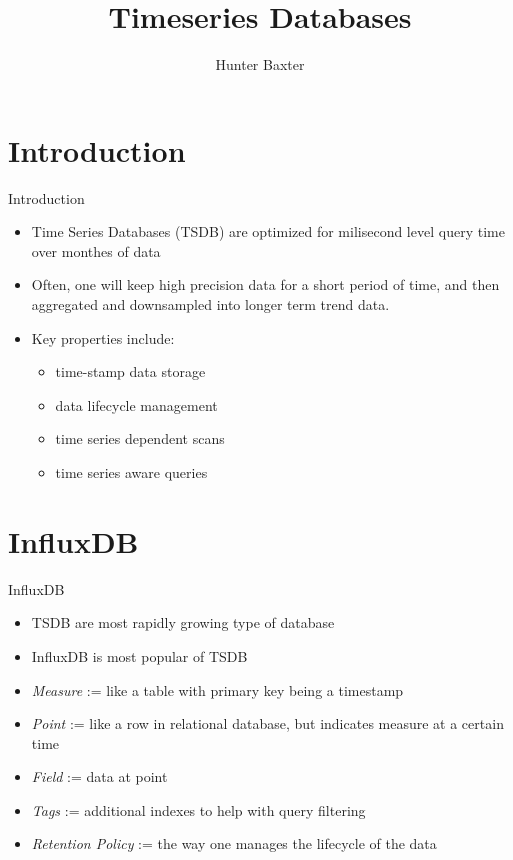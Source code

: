 \documentclass{beamer}
\title{Timeseries Databases}
\author{Hunter Baxter}
\begin{document}
\maketitle

\section{Introduction}
\begin{frame}{Introduction}
\begin{itemize}
    \item Time Series Databases (TSDB) are optimized for milisecond level query time over monthes of data
    \item Often, one will keep high precision data for a short period of time, and then aggregated and downsampled into longer term trend data. 
    \item Key properties include:
        \begin{itemize}
            \item time-stamp data storage
            \item data lifecycle management
            \item time series dependent scans
            \item time series aware queries
        \end{itemize}
\end{itemize}
\end{frame}

\section{InfluxDB}
\begin{frame}{InfluxDB}
\begin{itemize}
    \item TSDB are most rapidly growing type of database
    \item InfluxDB is most popular of TSDB
    \item \textit{Measure} := like a table with primary key being a timestamp
    \item \textit{Point} := like a row in relational database, but indicates measure at a certain time
    \item \textit{Field} := data at point
    \item \textit{Tags} := additional indexes to help with query filtering
    \item \textit{Retention Policy} := the way one manages the lifecycle of the data
\end{itemize}
    
\end{frame}
\end{document}
